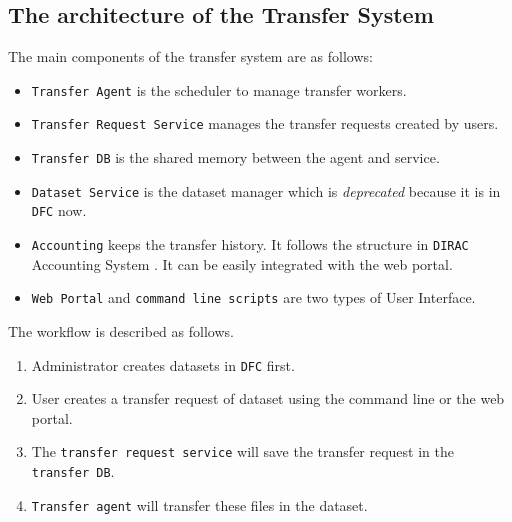 \subsection{The architecture of the Transfer System}
The main components of the transfer system are as follows:
\begin{itemize}
    \item {\tt Transfer Agent} is the scheduler to manage transfer workers.
    \item {\tt Transfer Request Service} manages the transfer requests
          created by users.
    \item {\tt Transfer DB} is the shared memory between the agent and 
          service. 
    \item {\tt Dataset Service} is the dataset manager which is 
          {\em deprecated} because it is in {\tt DFC} now.
    \item {\tt Accounting} keeps the transfer history.
          It follows the structure in {\tt DIRAC} Accounting System
          \cite{bib:diracacct}.
          It can be easily integrated with the web portal.
    \item {\tt Web Portal} and {\tt command line scripts} are  
          two types of User Interface.
\end{itemize}

The workflow is described as follows.
\begin{enumerate}
\item Administrator creates datasets in {\tt DFC} first. 
\item User creates a transfer request of dataset using the command line 
      or the web portal.
\item The {\tt transfer request service} will save the transfer 
      request in the {\tt transfer DB}.
\item {\tt Transfer agent} will transfer these files in the dataset.
\end{enumerate}


